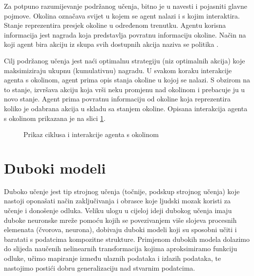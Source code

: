 
Za potpuno razumijevanje podržanog učenja, bitno je u navesti i pojasniti glavne pojmove. Okolina  označava svijet u kojem se agent nalazi i s kojim interaktira. Stanje  reprezentira presjek okoline u određenom trenutku. Agentu korisna informacija jest nagrada  koja predstavlja povratnu informaciju okoline. Način na koji agent bira akciju  iz skupa svih dostupnih akcija naziva se politika .



Cilj podržanog učenja jest naći optimalnu strategiju (niz optimalnih akcija) koje maksimiziraju ukupnu (kumulativnu) nagradu. U svakom koraku interakcije agenta s okolinom, agent prima opis stanja okoline u kojoj se nalazi. S obzirom na to stanje, izvršava akciju koja vrši neku promjenu nad okolinom i prebacuje ju u novo stanje. Agent prima povratnu informaciju od okoline koja reprezentira koliko je odabrana akcija u skladu sa stanjem okoline. Opisana interakcija agenta s okolinom prikazana je na slici \ref{fig:rl}.

\begin{figure}[h]
    \centering
    \caption{Prikaz ciklusa i interakcije agenta s okolinom}
    \label{fig:rl}
\end{figure}

\section{Duboki modeli}

Duboko učenje  jest tip strojnog učenja (točnije, podskup strojnog učenja) koje nastoji oponašati način zaključivanja i obrasce koje ljudski mozak koristi za učenje i donošenje odluka. Veliku ulogu u cijeloj ideji dubokog učenja imaju duboke neuronske mreže  pomoću kojih se povezivanjem više slojeva procesnih elemenata (čvorova, neurona), dobivaju duboki modeli koji su sposobni učiti i baratati s podatcima kompozitne strukture. Primjenom dubokih modela dolazimo do slijeda naučenih nelinearnih transformacija kojima aproksimiramo funkciju odluke, učimo mapiranje između ulaznih podataka i izlazih podataka, te nastojimo postići dobru generalizaciju nad stvarnim podatcima. 


